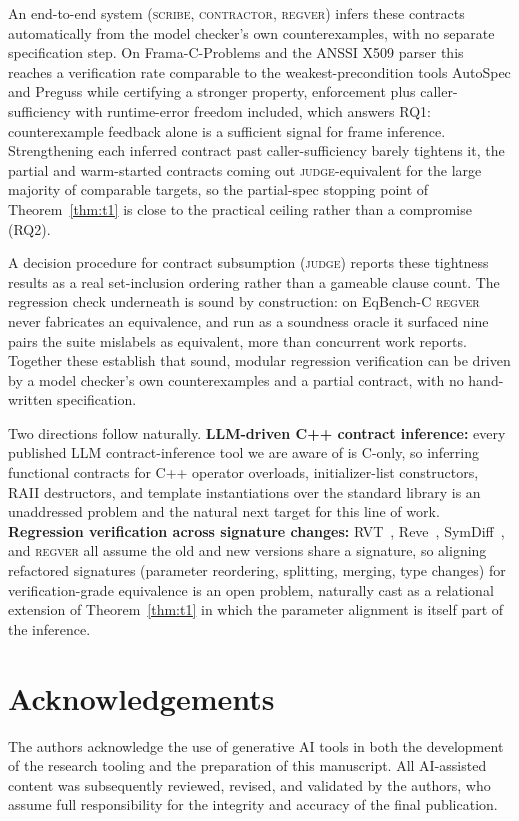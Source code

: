 \documentclass[conference]{IEEEtran}
\theoremstyle{definition}
\theoremstyle{remark}
\begin{document}
An end-to-end system (\textsc{scribe}, \textsc{contractor},
\textsc{regver}) infers these contracts automatically from the model
checker's own counterexamples, with no separate specification step. On
Frama-C-Problems and the ANSSI X509 parser this reaches a verification
rate comparable to the weakest-precondition tools AutoSpec and Preguss
while certifying a stronger property, enforcement plus
caller-sufficiency with runtime-error freedom included, which answers
RQ1: counterexample feedback alone is a sufficient signal for frame
inference. Strengthening each inferred contract past caller-sufficiency
barely tightens it, the partial and warm-started contracts coming out
\textsc{judge}-equivalent for the large majority of comparable targets,
so the partial-spec stopping point of Theorem~\ref{thm:t1} is close to
the practical ceiling rather than a compromise (RQ2).

A decision procedure for contract subsumption (\textsc{judge}) reports
these tightness results as a real set-inclusion ordering rather than a
gameable clause count. The regression check underneath is sound by
construction: on EqBench-C \textsc{regver} never fabricates an
equivalence, and run as a soundness oracle it surfaced nine pairs the
suite mislabels as equivalent, more than concurrent work reports.
Together these establish that sound, modular regression verification
can be driven by a model checker's own counterexamples and a partial
contract, with no hand-written specification.

Two directions follow naturally. \textbf{LLM-driven C++ contract
inference:} every published LLM contract-inference tool we are aware of
is C-only, so inferring functional contracts for C++ operator
overloads, initializer-list constructors, RAII destructors, and
template instantiations over the standard library is an unaddressed
problem and the natural next target for this line of work.
\textbf{Regression verification across signature changes:}
RVT~\cite{godlin2013rv}, Reve~\cite{klebanov2018reve},
SymDiff~\cite{lahiri2012symdiff}, and \textsc{regver} all assume the
old and new versions share a signature, so aligning refactored
signatures (parameter reordering, splitting, merging, type changes) for
verification-grade equivalence is an open problem, naturally cast as a
relational extension of Theorem~\ref{thm:t1} in which the parameter
alignment is itself part of the inference.


\section{Acknowledgements}

The authors acknowledge the use of generative AI tools in both the
development of the research tooling and the preparation of this
manuscript. All AI-assisted content was subsequently reviewed, revised,
and validated by the authors, who assume full responsibility for the
integrity and accuracy of the final publication.

\clearpage



\end{document}
